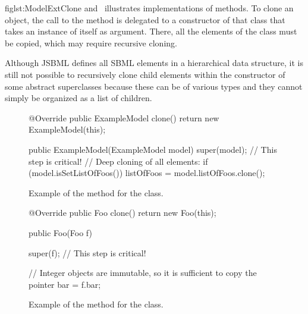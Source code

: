 fig{lst:ModelExtClone} and~ illustrates
implementations of  methods.  To clone an object, the call to
the  method is delegated to a constructor of that class that
takes an instance of itself as argument.  There, all the elements of the
class must be copied, which may require recursive cloning.

Although JSBML defines all SBML elements in a hierarchical data structure, it
is still not possible to recursively clone child elements within the
constructor of some abstract superclasses because these can be of various
types and they cannot simply be organized as a list of children.

\begin{figure}[htb]
  \begin{example}
@Override public ExampleModel clone() {
  return new ExampleModel(this);
}

public ExampleModel(ExampleModel model) {
  super(model);  // This step is critical!
  // Deep cloning of all elements:
  if (model.isSetListOfFoos()) {
    listOfFoos = model.listOfFoos.clone();
  }
}\end{example}
 \caption{Example of the  method for the  class.}
 \label{lst:ModelExtClone}
\end{figure}

\begin{figure}[htb]
  \begin{example}
@Override public Foo clone() {
  return new Foo(this);
}

public Foo(Foo f) {
  super(f);  // This step is critical!

  // Integer objects are immutable, so it is sufficient to copy the pointer
  bar = f.bar;
}\end{example}
  \caption{Example of the  method for the  class.}
  \label{lst:ModelExtCloneFoo}
\end{figure}


